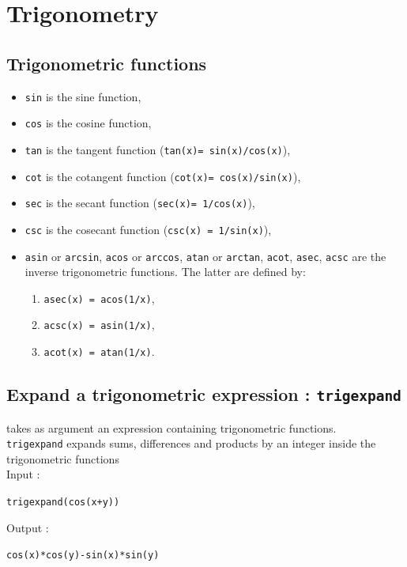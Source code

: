 \documentclass[a4paper,11pt]{book}
\begin{document}
\section{Trigonometry}
\subsection{Trigonometric functions}\label{sec:trigo}
\begin{itemize}
\item {\tt sin}  is the sine function,
\item {\tt cos}   is the cosine function,
\item  {\tt tan}  is the tangent function ({\tt tan(x)=
    sin(x)/cos(x)}),
\item 
{\tt cot}   is the cotangent function ({\tt cot(x)=
  cos(x)/sin(x)}),
\item 
{\tt sec}   is the secant function ({\tt sec(x)=
  1/cos(x)}),
\item
{\tt csc}   is the cosecant function ({\tt csc(x) =
  1/sin(x)}),
\item
{\tt asin} or {\tt arcsin}, {\tt acos} or {\tt arccos}, {\tt atan} or {\tt arctan}, {\tt acot}, {\tt asec}, {\tt acsc}
are the inverse trigonometric functions. The latter are defined by:
\begin{enumerate}
\item {\tt asec(x) = acos(1/x)}, 
\item
{\tt acsc(x) = asin(1/x)},
\item
{\tt  acot(x) = atan(1/x)}. 
\end{enumerate}
\end{itemize}


\subsection{Expand a trigonometric expression : {\tt trigexpand}}
 takes as argument an expression
containing trigonometric functions.\\
{\tt trigexpand} expands sums, differences and products by an integer
inside the trigonometric functions \\
Input :
\begin{center}{\tt trigexpand(cos(x+y))}\end{center}
Output :
\begin{center}{\tt cos(x)*cos(y)-sin(x)*sin(y)}\end{center}
\end{document}
